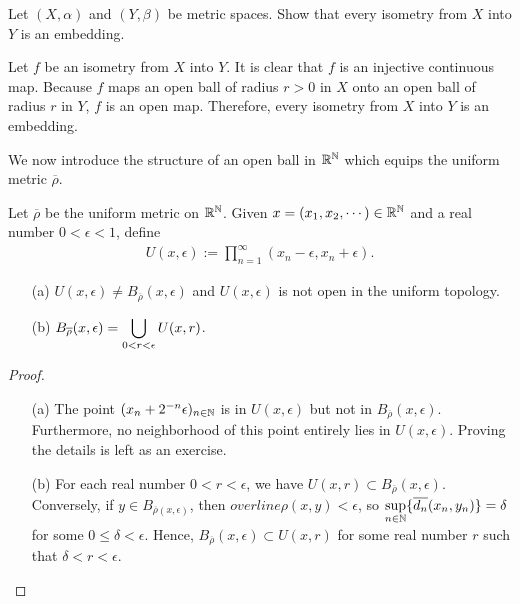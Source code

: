 \begin{prob}
    Let $(X, \alpha)$ and $(Y, \beta)$ be metric spaces.
    Show that every isometry from $X$ into $Y$ is an embedding.
\end{prob}
\begin{sol}
    Let $f$ be an isometry from $X$ into $Y$.
    It is clear that $f$ is an injective continuous map.
    Because $f$ maps an open ball of radius $r>0$ in $X$ onto an open ball of radius $r$ in $Y$, $f$ is an open map.
    Therefore, every isometry from $X$ into $Y$ is an embedding.
\end{sol}

We now introduce the structure of an open ball in ${\mathbb{R}}^{\mathbb{N}}$ which equips the uniform metric $\overline{\rho}$.
\begin{prop}
    Let $\overline{\rho}$ be the uniform metric on ${\mathbb{R}}^{\mathbb{N}}$.
    Given $x=(x_1, x_2, \cdots)\in{\mathbb{R}}^{\mathbb{N}}$ and a real number $0<\epsilon<1$, define
    \begin{align*}
        U(x, \epsilon):=\prod_{n=1}^\infty (x_n-\epsilon, x_n+\epsilon).
    \end{align*}
    \begin{enumerate}
        \item[(a)] $U(x, \epsilon)\neq B_{\overline{\rho}}(x, \epsilon)$ and $U(x, \epsilon)$ is not open in the uniform topology.
        \item[(b)] $\displaystyle{B_{\overline{\rho}}(x, \epsilon)=\bigcup_{0<r<\epsilon} U(x, r)}$.
    \end{enumerate}
\end{prop}
\begin{proof}
    \begin{enumerate}
        \item[(a)]
            The point $(x_n+2^{-n}\epsilon)_{n\in{\mathbb{N}}}$ is in $U(x, \epsilon)$ but not in $B_{\overline{\rho}}(x, \epsilon)$.
            Furthermore, no neighborhood of this point entirely lies in $U(x, \epsilon)$.
            Proving the details is left as an exercise.
        \item[(b)]
            For each real number $0<r<\epsilon$, we have $U(x, r)\subset B_{\overline{\rho}}(x, \epsilon)$.
            Conversely, if $y\in B_{\overline{\rho}(x, \epsilon)}$, then $overline{\rho}(x, y)<\epsilon$, so $\displaystyle{\sup_{n\in{\mathbb{N}}}}\{\overline{d_n}(x_n, y_n)\}=\delta$ for some $0\leq\delta<\epsilon$.
            Hence, $B_{\overline{\rho}}(x, \epsilon)\subset U(x, r)$ for some real number $r$ such that $\delta<r<\epsilon$.
    \end{enumerate}
\end{proof}